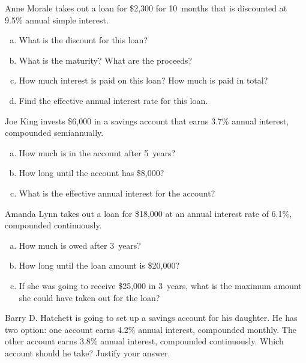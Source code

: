 \documentclass[11pt,letterpaper]{article}
\begin{document}

 Anne Morale takes out a loan for \$2,300 for 10~months that is discounted at 9.5\% annual simple interest.
	\begin{enumerate}[(a)]
	\item What is the discount for this loan?
	\item What is the maturity? What are the proceeds?
	\item How much interest is paid on this loan? How much is paid in total?
	\item Find the effective annual interest rate for this loan.
	\end{enumerate}



\newpage



 Joe King invests \$6,000 in a savings account that earns 3.7\% annual interest, compounded semiannually. 
	\begin{enumerate}[(a)]
	\item How much is in the account after 5~years?
	\item How long until the account has \$8,000?
	\item What is the effective annual interest for the account?
	\end{enumerate}



\newpage



 Amanda Lynn takes out a loan for \$18,000 at an annual interest rate of 6.1\%, compounded continuously. 
	\begin{enumerate}[(a)]
	\item How much is owed after 3~years?
	\item How long until the loan amount is \$20,000?
	\item If she was going to receive \$25,000 in 3~years, what is the maximum amount she could have taken out for the loan?
	\end{enumerate}



\newpage



 Barry D. Hatchett is going to set up a savings account for his daughter. He has two option: one account earns 4.2\% annual interest, compounded monthly. The other account earns 3.8\% annual interest, compounded continuously. Which account should he take? Justify your answer.
\end{document}
